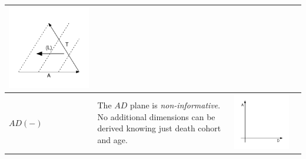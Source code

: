 \documentclass[11pt,oneside,a4paper]{article} %
\begin{document}
\begin{center}
\begin{longtable}{m{}m{}m{}m{}}
  \includegraphics[width = \linewidth]{Figures/JonasTable/TAl_iso.pdf}  \\
  \midrule
  $AD(-)$ &
  The $AD$ plane is \emph{non-informative}. No additional dimensions can be derived knowing just death cohort and age. &
  \includegraphics[width = \linewidth]{Figures/JonasTable/AD.pdf} &

\end{longtable}
\end{center}
\end{document}

